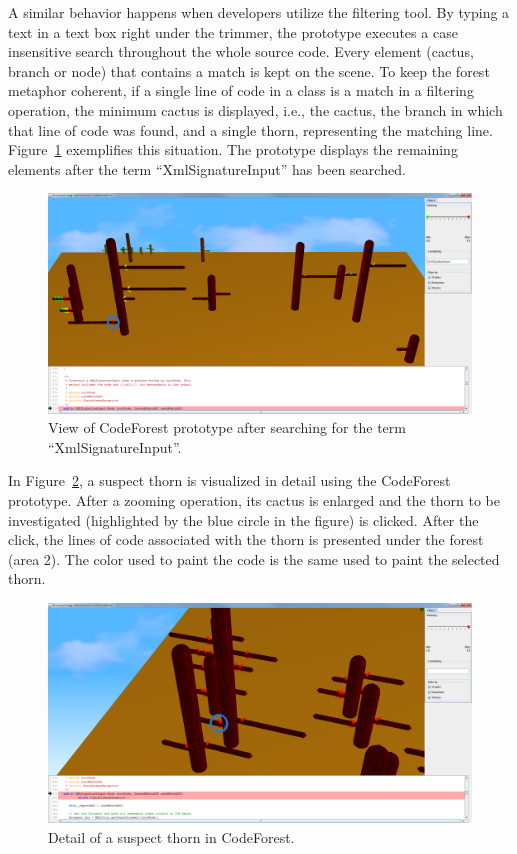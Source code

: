 A similar behavior happens when developers utilize the filtering tool. By typing
a text in a text box right under the trimmer, the prototype executes a case
insensitive search throughout the whole source code. Every element (cactus,
branch or node) that contains a match is kept on the scene. To keep the forest
metaphor coherent, if a single line of code in a class is a match in a filtering
operation, the minimum cactus is displayed, i.e., the cactus, the branch in
which that line of code was found, and a single thorn, representing the matching
line.
Figure~\ref{fig:xml-security-text-trimmed} exemplifies this situation. The
prototype displays the remaining elements after the term ``XmlSignatureInput''
has been searched.

\begin{figure}
  \centering
    \includegraphics[width=\linewidth]{figures/fig-cf-example-03-alt}
  \caption{View of CodeForest prototype after searching for the term ``XmlSignatureInput''.}
  \label{fig:xml-security-text-trimmed}
\end{figure}

In Figure~\ref{fig:xml-security-detail}, a suspect thorn is visualized in detail
using the CodeForest prototype. After a zooming operation, its cactus is
enlarged and the thorn to be investigated (highlighted by the blue circle in the
figure) is clicked. After the click, the lines of code associated with the thorn
is presented under the forest (area 2). The color used to paint the code is the
same used to paint the selected thorn.

\begin{figure}
  \centering
    \includegraphics[width=\linewidth]{figures/fig-cf-example-05-alt}
  \caption{Detail of a suspect thorn in CodeForest.}
  \label{fig:xml-security-detail}
\end{figure}

